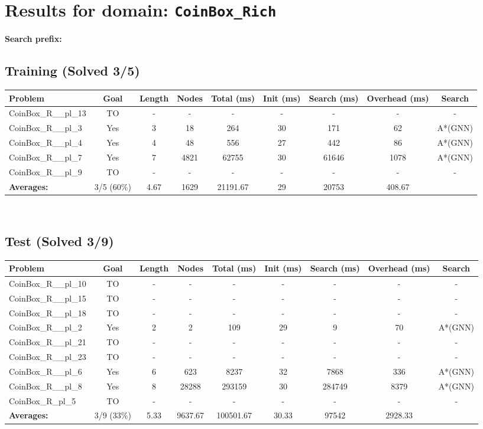 \documentclass{article}
\begin{document}
\section*{Results for domain: \texttt{CoinBox\_Rich}}
\textbf{Search prefix:} 
\\[0.5cm]
\subsection*{Training (Solved 3/5)}
\begin{tabular}{lcccccccc}
\toprule
Problem & Goal & Length & Nodes & Total (ms) & Init (ms) & Search (ms) & Overhead (ms) & Search \\
\midrule
CoinBox\_R\_\_pl\_13 & TO & - & - & - & - & - & - & - \\
CoinBox\_R\_\_pl\_3 & Yes & 3 & 18 & 264 & 30 & 171 & 62 & A*(GNN) \\
CoinBox\_R\_\_pl\_4 & Yes & 4 & 48 & 556 & 27 & 442 & 86 & A*(GNN) \\
CoinBox\_R\_\_pl\_7 & Yes & 7 & 4821 & 62755 & 30 & 61646 & 1078 & A*(GNN) \\
CoinBox\_R\_\_pl\_9 & TO & - & - & - & - & - & - & - \\
\textbf{Averages:} & 3/5 (60\%) & 4.67 & 1629 & 21191.67 & 29 & 20753 & 408.67 & \\
\bottomrule
\end{tabular}
\\[0.7cm]
\subsection*{Test (Solved 3/9)}
\begin{tabular}{lcccccccc}
\toprule
Problem & Goal & Length & Nodes & Total (ms) & Init (ms) & Search (ms) & Overhead (ms) & Search \\
\midrule
CoinBox\_R\_\_pl\_10 & TO & - & - & - & - & - & - & - \\
CoinBox\_R\_\_pl\_15 & TO & - & - & - & - & - & - & - \\
CoinBox\_R\_\_pl\_18 & TO & - & - & - & - & - & - & - \\
CoinBox\_R\_\_pl\_2 & Yes & 2 & 2 & 109 & 29 & 9 & 70 & A*(GNN) \\
CoinBox\_R\_\_pl\_21 & TO & - & - & - & - & - & - & - \\
CoinBox\_R\_\_pl\_23 & TO & - & - & - & - & - & - & - \\
CoinBox\_R\_\_pl\_6 & Yes & 6 & 623 & 8237 & 32 & 7868 & 336 & A*(GNN) \\
CoinBox\_R\_\_pl\_8 & Yes & 8 & 28288 & 293159 & 30 & 284749 & 8379 & A*(GNN) \\
CoinBox\_R\_pl\_5 & TO & - & - & - & - & - & - & - \\
\textbf{Averages:} & 3/9 (33\%) & 5.33 & 9637.67 & 100501.67 & 30.33 & 97542 & 2928.33 & \\
\bottomrule
\end{tabular}
\\[0.7cm]
\end{document}
